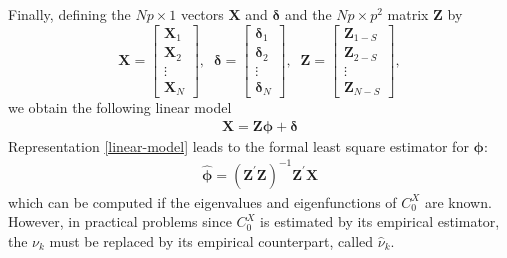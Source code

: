 \documentclass[11pt,a4paper]{article}
\newtheorem{Theorem} {Theorem}[section]
\numberwithin{equation}{section}
\newcommand{\E}{\mathbb{E}}
\begin{document}
Finally, defining the $Np\times1$ vectors $\bm{X}$ and $\bm{\delta}$ and the $Np\times p^{2}$ matrix $\bm{Z}$ by
\[
  \bm{X} = \begin{bmatrix}
             \bm{X}_{1} \\
             \bm{X}_{2} \\
             \vdots \\
             \bm{X}_{N}
           \end{bmatrix},\;\;
  \bm{\delta} = \begin{bmatrix}
              \bm{\delta}_{1} \\
              \bm{\delta}_{2} \\
              \vdots \\
              \bm{\delta}_{N}
            \end{bmatrix},\;\;
  \bm{Z} = \begin{bmatrix}
              \bm{Z}_{1-S} \\
              \bm{Z}_{2-S} \\
              \vdots \\
              \bm{Z}_{N-S}
            \end{bmatrix},
\]
we obtain the following linear model
\begin{align}\label{linear-model}
  \bm{X}=\bm{Z}\bm{\phi}+\bm{\delta}
\end{align}
Representation \eqref{linear-model} leads to the formal least square estimator for $\bm{\phi}:$
\begin{align}
  \hat{\bm{\phi}}=(\bm{Z}^{\prime}\bm{Z})^{-1}\bm{Z}^{\prime}\bm{X}
\end{align}
which can be computed if the eigenvalues and eigenfunctions of $C_0^X$ are known. However, in practical problems since $C_0^X$ is estimated by its empirical estimator, the $\nu_{k}$ must be replaced by its empirical counterpart, called $\hat{\nu}_{k}$.

\end{document}
